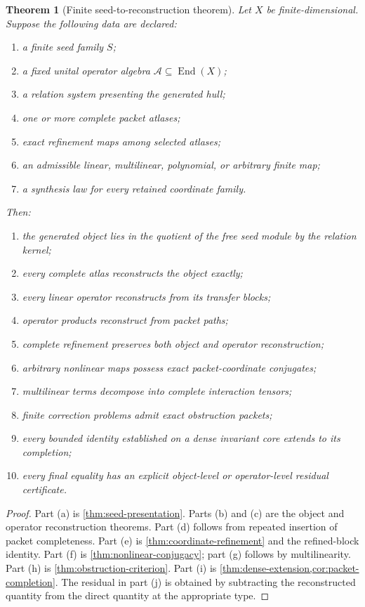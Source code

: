 \documentclass[11pt,oneside]{book}
\newtheorem{theorem}{Theorem}[chapter]
\theoremstyle{definition}
\theoremstyle{remark}
\begin{document}
\begin{theorem}[Finite seed-to-reconstruction theorem]\label{thm:seed-to-reconstruction}
Let $X$ be finite-dimensional.  Suppose the following data are declared:
\begin{enumerate}[label=(\roman*),leftmargin=2em]
\item a finite seed family $S$;
\item a fixed unital operator algebra $\mathcal A\subseteq\operatorname{End}(X)$;
\item a relation system presenting the generated hull;
\item one or more complete packet atlases;
\item exact refinement maps among selected atlases;
\item an admissible linear, multilinear, polynomial, or arbitrary finite map;
\item a synthesis law for every retained coordinate family.
\end{enumerate}
Then:
\begin{enumerate}[label=(\alph*),leftmargin=2em]
\item the generated object lies in the quotient of the free seed module by the relation kernel;
\item every complete atlas reconstructs the object exactly;
\item every linear operator reconstructs from its transfer blocks;
\item operator products reconstruct from packet paths;
\item complete refinement preserves both object and operator reconstruction;
\item arbitrary nonlinear maps possess exact packet-coordinate conjugates;
\item multilinear terms decompose into complete interaction tensors;
\item finite correction problems admit exact obstruction packets;
\item every bounded identity established on a dense invariant core extends to its completion;
\item every final equality has an explicit object-level or operator-level residual certificate.
\end{enumerate}
\end{theorem}

\begin{proof}
Part (a) is \cref{thm:seed-presentation}.  Parts (b) and (c) are the object and operator reconstruction theorems.  Part (d) follows from repeated insertion of packet completeness.  Part (e) is \cref{thm:coordinate-refinement} and the refined-block identity.  Part (f) is \cref{thm:nonlinear-conjugacy}; part (g) follows by multilinearity.  Part (h) is \cref{thm:obstruction-criterion}.  Part (i) is \cref{thm:dense-extension,cor:packet-completion}.  The residual in part (j) is obtained by subtracting the reconstructed quantity from the direct quantity at the appropriate type.
\end{proof}
\end{document}
